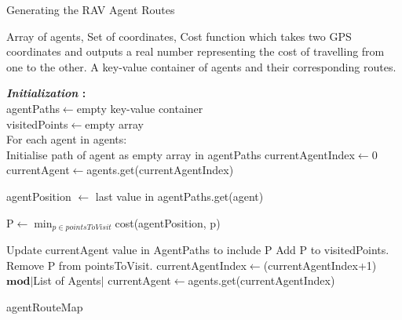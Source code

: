 \begin{algorithm}
\caption{Generating the RAV Agent Routes}
\label{alg:bayes_filter_observations_only}
\begin{algorithmic}[1]
\renewcommand{\algorithmicrequire}{\textbf{Input:}}
\renewcommand{\algorithmicensure}{\textbf{Output:}}
\REQUIRE Array of agents, Set of coordinates, Cost function which takes two GPS coordinates and outputs a real number representing the cost of travelling from one to the other. 
\ENSURE  A key-value container of agents and their corresponding routes.\\
\hfill\pagebreak

\noindent\textbf{\textit{\noindent Initialization} :}\\
agentPaths$\leftarrow$empty key-value container\\
visitedPoints$\leftarrow$empty array
\\
For each agent in agents:\\
\quad Initialise path of agent as empty array in agentPaths
currentAgentIndex$\leftarrow$0\\
currentAgent$\leftarrow$agents.get(currentAgentIndex)\\
\hfill\pagebreak


\STATE agentPosition $\leftarrow$ last value in agentPaths.get(agent)

\STATE P$\leftarrow$\(\displaystyle \min_{p \in pointsToVisit}\)cost(agentPosition, p)

\STATE Update currentAgent value in AgentPaths to include P
\STATE Add P to visitedPoints.
\STATE Remove P from pointsToVisit.
\STATE currentAgentIndex$\leftarrow$(currentAgentIndex+1) $\mathbf{mod}$$\vert$List of Agents$\vert$
\STATE currentAgent$\leftarrow$agents.get(currentAgentIndex)


\ENDWHILE
\RETURN agentRouteMap
\end{algorithmic} 
\end{algorithm}



